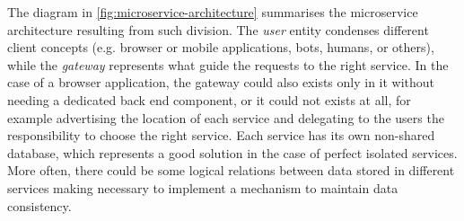 The diagram in \autoref{fig:microservice-architecture} summarises the
microservice architecture resulting from such division. The \emph{user} entity
condenses different client concepts (e.g. browser or mobile applications, bots,
humans, or others), while the \emph{gateway} represents what guide the requests
to the right service. In the case of a browser application, the gateway could
also exists only in it without needing a dedicated back end component, or it
could not exists at all, for example advertising the location of each service
and delegating to the users the responsibility to choose the right service. Each
service has its own non-shared database, which represents a good solution in the
case of perfect isolated services. More often, there could be some logical
relations between data stored in different services making necessary to
implement a mechanism to maintain data consistency.